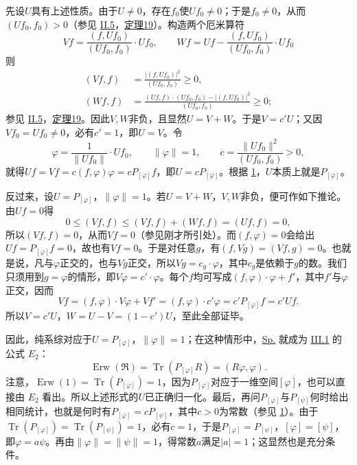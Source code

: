 \documentclass[fontsize=13pt,twoside,openany,headings=normal,parskip=false,bookmarkpackage=false,DIV=calc]{scrbook}
\begin{document}
先设$U$具有上述性质。由于$U\ne0$，存在$f_0$使$Uf_0\ne0$；于是$f_0\ne0$，从而$(Uf_0,\allowbreak f_0)>0$（参见 \hyperref[sec:II.5]{II.5}，\CJKglue \hyperref[thm:II.19]{定理19}）。构造两个厄米算符
\[
Vf=\frac{(f,Uf_0)}{(Uf_0,f_0)}\cdot Uf_0,\qquad
Wf=Uf-\frac{(f,Uf_0)}{(Uf_0,f_0)}\cdot Uf_0
\]
则
\begin{align*}
(Vf,f)&=\frac{|(f,Uf_0)|^2}{(Uf_0,f_0)}\geq0,\\
(Wf,f)&=\frac{(Uf,f)\cdot(Uf_0,f_0)-|(f,Uf_0)|^2}{(Uf_0,f_0)}\geq0;
\end{align*}
参见 \hyperref[sec:II.5]{II.5}，\CJKglue \hyperref[thm:II.19]{定理19}。因此$V,\allowbreak W$非负，且显然$U=V+W$。于是$V=c'U$；又因$Vf_0=Uf_0\ne0$，必有$c'=1$，即$U=V$。令
\[
\varphi=\frac{1}{\|Uf_0\|}\cdot Uf_0,\qquad\|\varphi\|=1,\qquad
c=\frac{\|Uf_0\|^2}{(Uf_0,f_0)}>0,
\]\hypertarget{origpage-170}{}\label{origpage-170}就得$Uf=Vf=c(f,\allowbreak \varphi)\varphi=cP_{[\varphi]}f$，即$U=cP_{[\varphi]}$。根据 \hyperref[remark:IV.2.1]{1}，$U$本质上就是$P_{[\varphi]}$。

反过来，设$U=P_{[\varphi]}$，$\|\varphi\|=1$。若$U=V+W$，$V,\allowbreak W$非负，便可作如下推论。由$Uf=0$得
\[
0\leq(Vf,f)\leq(Vf,f)+(Wf,f)=(Uf,f)=0,
\]
所以$(Vf,\allowbreak f)=0$，从而$Vf=0$（参见刚才所引处）。而$(f,\allowbreak \varphi)=0$会给出$Uf=P_{[\varphi]}f=0$，故也有$Vf=0$。于是对任意$g$，有$(f,\allowbreak Vg)=(Vf,\allowbreak g)=0$。也就是说，凡与$\varphi$正交的，也与$Vg$正交，所以$Vg=c_g\cdot\varphi$，其中$c_g$是依赖于$g$的数。我们只须用到$g=\varphi$的情形，即$V\varphi=c'\cdot\varphi$。每个$f$均可写成$(f,\allowbreak \varphi)\cdot\varphi+f'$，其中$f'$与$\varphi$正交，因而
\[
Vf=(f,\varphi)\cdot V\varphi+Vf'=(f,\varphi)\cdot c'\varphi=c'P_{[\varphi]}f=c'Uf.
\]
所以$V=c'U$，$W=U-V=(1-c')U$，至此全部证毕。

因此，纯系综对应于$U=P_{[\varphi]}$，$\|\varphi\|=1$；在这种情形中，\hyperref[eq:IV.2.Sp]{Sp.} 就成为 \hyperref[sec:III.1]{III.1} 的公式 \hyperref[post:III.1.E2]{$E_2$}：
\begin{equation}\tag{$E_2$}\label{eq:IV.2.E2}
\operatorname{Erw}(\mathfrak R)=\operatorname{Tr}(P_{[\varphi]}R)=(R\varphi,\varphi).
\end{equation}
注意，$\operatorname{Erw}(1)=\operatorname{Tr}(P_{[\varphi]})=1$，因为$P_{[\varphi]}$对应于一维空间$[\varphi]$，也可以直接由 \hyperref[eq:IV.2.E2]{$E_2$} 看出。所以上述形式的$U$已正确归一化。最后，再问$P_{[\varphi]}$与$P_{[\psi]}$何时给出相同统计，也就是何时有$P_{[\varphi]}=cP_{[\psi]}$，其中$c>0$为常数（参见 \hyperref[remark:IV.2.1]{1}）。由于$\operatorname{Tr}(P_{[\varphi]})=\operatorname{Tr}(P_{[\psi]})=1$，必有$c=1$，于是$P_{[\varphi]}=P_{[\psi]}$，$[\varphi]=[\psi]$，即$\varphi=a\psi$。再由$\|\varphi\|=\|\psi\|=1$，得常数$a$满足$|a|=1$；这显然也是充分条件。
\end{document}
